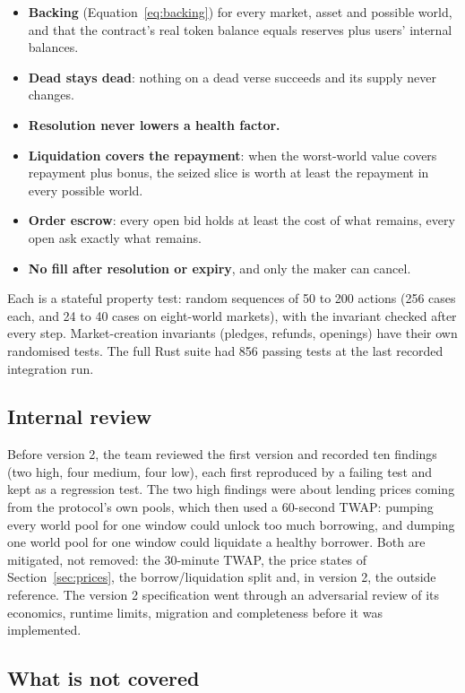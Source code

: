 \documentclass[11pt,a4paper]{article}
\begin{document}
\begin{itemize}
\item \textbf{Backing} (Equation~\ref{eq:backing}) for every market, asset and possible world, and that the contract's
real token balance equals reserves plus users' internal balances.
\item \textbf{Dead stays dead}: nothing on a dead verse succeeds and its supply never changes.
\item \textbf{Resolution never lowers a health factor.}
\item \textbf{Liquidation covers the repayment}: when the worst-world value covers repayment plus bonus, the seized
slice is worth at least the repayment in every possible world.
\item \textbf{Order escrow}: every open bid holds at least the cost of what remains, every open ask exactly what
remains.
\item \textbf{No fill after resolution or expiry}, and only the maker can cancel.
\end{itemize}
Each is a stateful property test: random sequences of 50 to 200 actions (256 cases each, and 24 to 40 cases on
eight-world markets), with the invariant checked after every step. Market-creation invariants (pledges, refunds, openings) have
their own randomised tests. The full Rust suite had 856 passing tests at the last recorded integration run.

\subsection{Internal review}

Before version 2, the team reviewed the first version and recorded ten findings (two high, four medium, four low),
each first reproduced by a failing test and kept as a regression test. The two high findings were about lending
prices coming from the protocol's own pools, which then used a 60-second TWAP: pumping every world pool for one
window could unlock too much borrowing, and dumping one world pool for one window could liquidate a healthy borrower.
Both are mitigated, not removed: the 30-minute TWAP, the price states of Section~\ref{sec:prices}, the
borrow/liquidation split and, in version 2, the outside reference. The version 2
specification went through an adversarial review of its economics, runtime limits, migration and completeness before
it was implemented.

\subsection{What is not covered}
\end{document}
